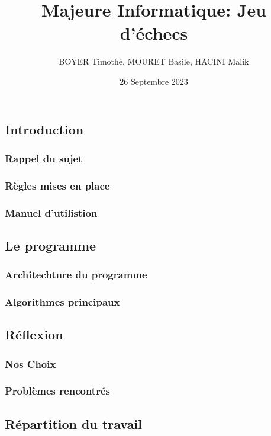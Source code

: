 \documentclass{article}
\title{\centering Majeure Informatique: 
Jeu d'échecs}
\author{BOYER Timothé, MOURET Basile, HACINI Malik}
\date{26 Septembre 2023}
\begin{document}
    
    

\maketitle
\tableofcontents{}

\newpage

\subsection{Introduction}
\subsubsection{Rappel du sujet}
\subsubsection{Règles mises en place}
\subsubsection{Manuel d'utilistion}

\newpage

\subsection{Le programme}
\subsubsection{Architechture du programme}
\subsubsection{Algorithmes principaux}

\newpage

\subsection{Réflexion}
\subsubsection{Nos Choix}
\subsubsection{Problèmes rencontrés}
\subsection{Répartition du travail}
\end{document}
